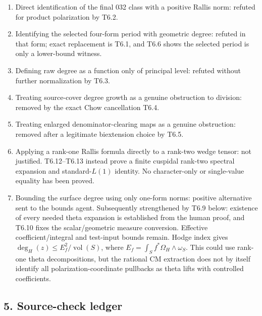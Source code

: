 \begin{enumerate}
\def\labelenumi{\arabic{enumi}.}
\tightlist
\item
  Direct identification of the final 032 class with a positive Rallis norm: refuted for product polarization by T6.2.
\item
  Identifying the selected four-form period with geometric degree: refuted in that form; exact replacement is T6.1, and T6.6 shows the selected period is only a lower-bound witness.
\item
  Defining raw degree as a function only of principal level: refuted without further normalization by T6.3.
\item
  Treating source-cover degree growth as a genuine obstruction to division: removed by the exact Chow cancellation T6.4.
\item
  Treating enlarged denominator-clearing maps as a genuine obstruction: removed after a legitimate biextension choice by T6.5.
\item
  Applying a rank-one Rallis formula directly to a rank-two wedge tensor: not justified. T6.12--T6.13 instead prove a finite cuspidal rank-two spectral expansion and standard-\(L(1)\) identity. No character-only or single-value equality has been proved.
\item
  Bounding the surface degree using only one-form norms: positive alternative sent to the bounds agent. Subsequently strengthened by T6.9 below: existence of every needed theta expansion is established from the human proof, and T6.10 fixes the scalar/geometric measure conversion. Effective coefficient/integral and test-input bounds remain. Hodge index gives \(\deg_H(z)\le E_f^2/\operatorname{vol}(S)\), where \(E_f=\int_Sf^*\Omega_H\wedge\omega_S\). This could use rank-one theta decompositions, but the rational CM extraction does not by itself identify all polarization-coordinate pullbacks as theta lifts with controlled coefficients.
\end{enumerate}

\subsection{5. Source-check ledger}\label{source-check-ledger}

